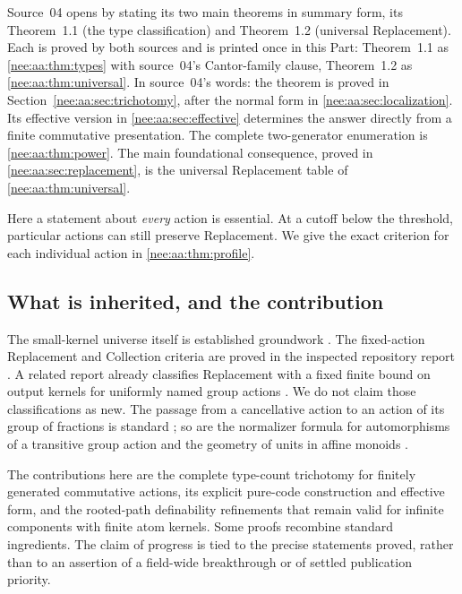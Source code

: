 \documentclass[11pt,letterpaper]{article}
\numberwithin{equation}{section}
\theoremstyle{plain}
\theoremstyle{definition}
\theoremstyle{remark}
\begin{document}
Source~04 opens by stating its two main theorems in summary form, its Theorem~1.1 (the type classification) and Theorem~1.2 (universal Replacement). Each is proved by both sources and is printed once in this Part: Theorem~1.1 as \cref{nee:aa:thm:types} with source~04's Cantor-family clause, Theorem~1.2 as \cref{nee:aa:thm:universal}. In source~04's words:
the theorem is proved in Section~\ref{nee:aa:sec:trichotomy}, after the normal form in
\cref{nee:aa:sec:localization}. Its effective version in \cref{nee:aa:sec:effective} determines
the answer directly from a finite commutative presentation. The complete
two-generator enumeration is \cref{nee:aa:thm:power}. The main
foundational consequence, proved in \cref{nee:aa:sec:replacement}, is the
universal Replacement table of \cref{nee:aa:thm:universal}.

Here a statement about \emph{every} action is essential. At a cutoff
below the threshold, particular actions can still preserve Replacement.
We give the exact criterion for each individual action in
\cref{nee:aa:thm:profile}.

\subsection{What is inherited, and the contribution}

The small-kernel universe itself is established groundwork \cite{Yao2023,GY2026}.
The fixed-action Replacement and Collection criteria are proved in the inspected
repository report \cite{RepoNamingIII}. A related report already classifies
Replacement with a fixed finite bound on output kernels for uniformly named
group actions \cite[Part VIII, Theorem 59.1]{RepoBirthday}. We do not claim those
classifications as new. The passage from a cancellative action to an action of
its group of fractions is standard \cite[Section 6]{BaileyRenshaw}; so are the
normalizer formula for automorphisms of a transitive group action \cite{Boardman}
and the geometry of units in affine monoids \cite{Koch}.

The contributions here are the complete type-count trichotomy for finitely
generated commutative actions, its explicit pure-code construction and effective
form, and the rooted-path definability refinements that remain valid for infinite
components with finite atom kernels. Some proofs recombine standard ingredients.
The claim of progress is tied to the precise statements proved, rather than to an
assertion of a field-wide breakthrough or of settled publication priority.
\end{document}
